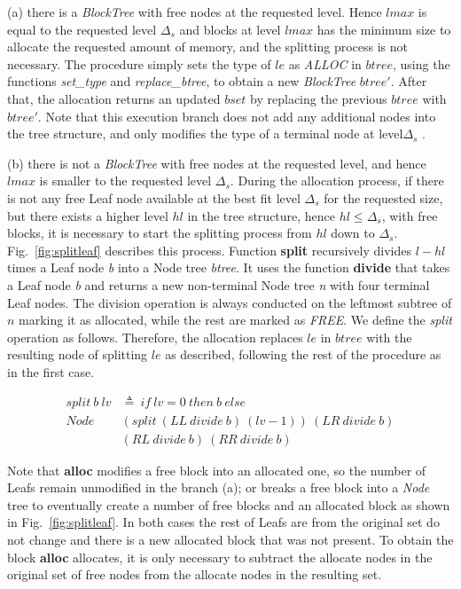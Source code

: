 (a) there is a \emph{BlockTree} with free nodes at the requested level. Hence $lmax$ is equal to the requested level $\Delta_s$ and blocks at level $lmax$ has the minimum size to allocate the requested amount of memory, and the splitting process is not necessary. The procedure simply sets the type of $le$ as \emph{ALLOC} in $btree$, using the functions \emph{set\_type} and \emph{replace\_btree}, to obtain a new \emph{BlockTree} $btree'$. After that, the allocation returns an updated $bset$ by replacing the previous $btree$ with $btree'$. Note that this execution branch does not add any additional nodes into the tree structure, and only modifies the type of a terminal node at level$\Delta_s$ .

(b) there is not a \emph{BlockTree} with free nodes at the requested level, and hence $lmax$ is smaller to the requested level $\Delta_s$. During the allocation process, if there is not any free Leaf node available at the best fit level $\Delta_s$ for the requested size, but there exists a higher level $hl$ in the tree structure, hence $hl \leq \Delta_s$, with free blocks, it is necessary to start the splitting process from $hl$ down to $\Delta_s$. Fig.~\ref{fig:splitleaf} describes this process. Function \textbf{split} recursively divides $l - hl$ times a Leaf node \emph{b} into a Node tree \emph{btree}. It uses the function \textbf{divide} that takes a Leaf node \emph{b} and returns a new non-terminal Node tree \emph{n} with four terminal Leaf nodes. The division operation is always conducted on the leftmost subtree of $n$ marking it as allocated, while the rest are marked as \emph{FREE}. We define the \emph{split} operation as follows. Therefore, the allocation replaces $le$ in $btree$ with the resulting node of splitting $le$ as described, following the rest of the procedure as in the first case.

\begin{definition} 
	\begin{align*}
	split\ b\ lv &\triangleq\ if\ lv = 0\ then\ b\ else\\
	Node\ &(split\ (LL\ divide\ b)\ (lv - 1))\ (LR\ divide\ b)\\ 
	&(RL\ divide\ b)\ (RR\ divide\ b)
	\end{align*}
\end{definition}


Note that \textbf{alloc} modifies a free block into an allocated one, so the number of Leafs remain unmodified in the branch (a); or breaks a free block into a \emph{Node} tree to eventually create a number of free blocks and an allocated block as shown in Fig.~\ref{fig:splitleaf}. In both cases the rest of Leafs are from the original set do not change and there is a new allocated block that was not present. To obtain the block \textbf{alloc} allocates, it is only necessary to subtract the allocate nodes in the original set of free nodes from the allocate nodes in the resulting set.

